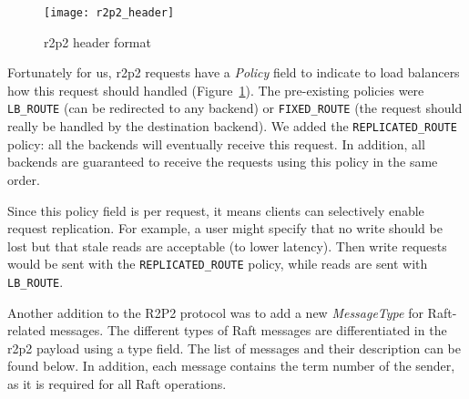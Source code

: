 \begin{figure}
    \centering
    \texttt{[image: r2p2\_header]}
    \caption{\gls{r2p2} header format\cite{r2p2}}
    \label{fig:r2p2-header}
\end{figure}


Fortunately for us, \gls{r2p2} requests have a \emph{Policy} field to indicate to load balancers how this request should handled (Figure~\ref{fig:r2p2-header}).
The pre-existing policies were \texttt{LB\_ROUTE} (can be redirected to any backend) or \texttt{FIXED\_ROUTE} (the request should really be handled by the destination backend).
We added the \texttt{REPLICATED\_ROUTE} policy: all the backends will eventually receive this request.
In addition, all backends are guaranteed to receive the requests using this policy in the same order.

Since this policy field is per request, it means clients can selectively enable request replication.
For example, a user might specify that no write should be lost but that stale reads are acceptable (to lower latency).
Then write requests would be sent with the \texttt{REPLICATED\_ROUTE} policy, while reads are sent with \texttt{LB\_ROUTE}.

Another addition to the R2P2 protocol was to add a new \emph{MessageType} for Raft-related messages.
The different types of Raft messages are differentiated in the \gls{r2p2} payload using a type field.
The list of messages and their description can be found below.
In addition, each message contains the term number of the sender, as it is required for all Raft operations.

